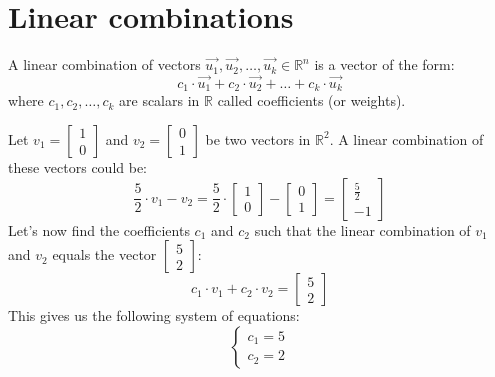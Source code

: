 
\section{Linear combinations}
\begin{definition}
    A linear combination of vectors $\vec{u_1}, \vec{u_2}, \ldots, \vec{u_k} \in \mathbb{R}^n$ is a vector of the form:
    \[
    c_1 \cdot \vec{u_1} + c_2 \cdot \vec{u_2} + \ldots + c_k \cdot \vec{u_k}
    \]
    where $c_1, c_2, \ldots, c_k$ are scalars in $\mathbb{R}$ called coefficients (or weights).
\end{definition}

\begin{eg}
    Let $v_1 = \begin{bmatrix} 1 \\ 0 \end{bmatrix}$ and $v_2 = \begin{bmatrix} 0 \\ 1 \end{bmatrix}$ be two vectors in $\mathbb{R}^2$. A linear combination of these vectors could be:
    \[
    \frac{5}{2} \cdot v_1 - v_2 = \frac{5}{2} \cdot \begin{bmatrix} 1 \\ 0 \end{bmatrix} -  \begin{bmatrix} 0 \\ 1 \end{bmatrix} = \begin{bmatrix} \frac{5}{2} \\ -1 \end{bmatrix}
    \]
    Let's now find the coefficients $c_1$ and $c_2$ such that the linear combination of $v_1$ and $v_2$ equals the vector $\begin{bmatrix} 5 \\ 2 \end{bmatrix}$:
    \[
    c_1 \cdot v_1 + c_2 \cdot v_2 = \begin{bmatrix} 5 \\ 2 \end{bmatrix}
    \]
    This gives us the following system of equations:
    \[
    \begin{cases}
    c_1 = 5 \\
    c_2 = 2
    \end{cases}
    \]
\end{eg}


